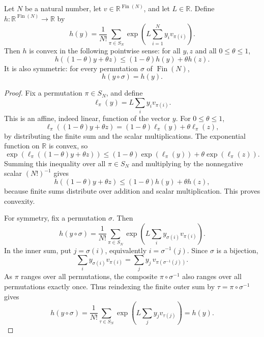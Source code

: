 \begin{helper}
Let \(N\) be a natural number, let
\(v\in\mathbb R^{\operatorname{Fin}(N)}\), and let \(L\in\mathbb R\).
Define \(h\colon\mathbb R^{\operatorname{Fin}(N)}\to\mathbb R\) by
\[
h(y)=\frac{1}{N!}\sum_{\pi\in S_N}
\exp\!\left(L\sum_{i=1}^N y_i v_{\pi(i)}\right).
\]
Then \(h\) is convex in the following pointwise sense:
for all \(y,z\) and all \(0\le\theta\le1\),
\[
h((1-\theta)y+\theta z)\le (1-\theta)h(y)+\theta h(z).
\]
It is also symmetric: for every permutation \(\sigma\) of
\(\operatorname{Fin}(N)\),
\[
h(y\circ\sigma)=h(y).
\]
\end{helper}
\begin{proof}
Fix a permutation \(\pi\in S_N\), and define
\[
\ell_\pi(y)=L\sum_i y_i v_{\pi(i)}.
\]
This is an affine, indeed linear, function of the vector \(y\).  For
\(0\le\theta\le1\),
\[
\ell_\pi((1-\theta)y+\theta z)
=(1-\theta)\ell_\pi(y)+\theta\ell_\pi(z),
\]
by distributing the finite sum and the scalar multiplications.  The
exponential function on \(\mathbb R\) is convex, so
\[
\exp(\ell_\pi((1-\theta)y+\theta z))
\le
(1-\theta)\exp(\ell_\pi(y))+\theta\exp(\ell_\pi(z)).
\]
Summing this inequality over all \(\pi\in S_N\) and multiplying by the
nonnegative scalar \((N!)^{-1}\) gives
\[
h((1-\theta)y+\theta z)
\le (1-\theta)h(y)+\theta h(z),
\]
because finite sums distribute over addition and scalar multiplication.
This proves convexity.

For symmetry, fix a permutation \(\sigma\).  Then
\[
h(y\circ\sigma)
=\frac1{N!}\sum_{\pi\in S_N}
\exp\!\left(L\sum_i y_{\sigma(i)}v_{\pi(i)}\right).
\]
In the inner sum, put \(j=\sigma(i)\), equivalently
\(i=\sigma^{-1}(j)\).  Since \(\sigma\) is a bijection,
\[
\sum_i y_{\sigma(i)}v_{\pi(i)}
=\sum_j y_j\,v_{\pi(\sigma^{-1}(j))}.
\]
As \(\pi\) ranges over all permutations, the composite
\(\pi\circ\sigma^{-1}\) also ranges over all permutations exactly once.
Thus reindexing the finite outer sum by
\(\tau=\pi\circ\sigma^{-1}\) gives
\[
h(y\circ\sigma)
=\frac1{N!}\sum_{\tau\in S_N}
\exp\!\left(L\sum_j y_j v_{\tau(j)}\right)
=h(y).
\]
\end{proof}
